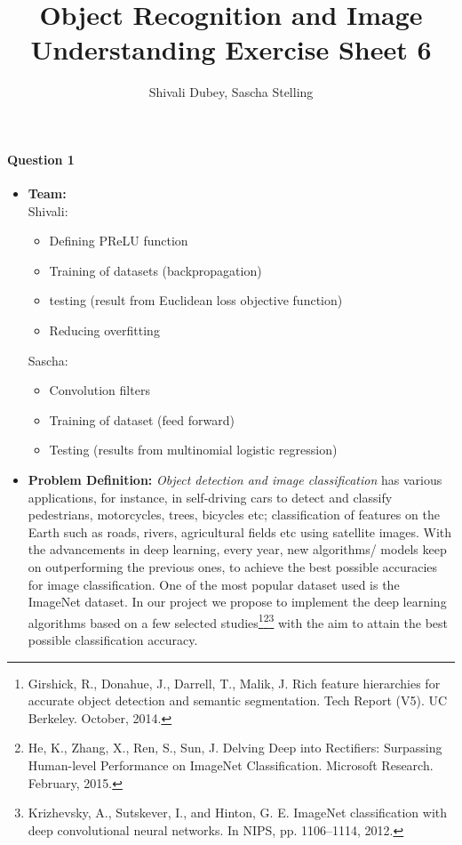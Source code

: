 \documentclass[8pt,a4]{article}
\author{Shivali Dubey, Sascha Stelling}
\title{Object Recognition and Image Understanding Exercise Sheet 6}
\begin{document}
\maketitle

\paragraph{Question 1}
\begin{itemize}
	\item \textbf{Team:} \\Shivali:
	\begin{itemize}
		\item Defining PReLU function
		\item Training of datasets (backpropagation)
		\item testing (result from Euclidean loss objective function)
		\item Reducing overfitting
	\end{itemize}
	Sascha:
	\begin{itemize}
		\item Convolution filters
		\item Training of dataset (feed forward)
		\item Testing (results from multinomial logistic regression)
	\end{itemize}
	\item \textbf{Problem Definition:} \textit{Object detection and image classification} has various applications, for instance, in self-driving cars to detect and classify pedestrians, motorcycles, trees, bicycles etc; classification of features on the Earth such as roads, rivers, agricultural fields etc using satellite images. With the advancements in deep learning, every year, new algorithms/ models keep on outperforming the previous ones, to achieve the best possible accuracies for image classification. One of the most popular dataset used is the ImageNet dataset. In our project we propose to implement the deep learning algorithms based on a few selected studies\footnote{Girshick, R., Donahue, J., Darrell, T., Malik, J. Rich feature hierarchies for accurate object detection and semantic segmentation. Tech Report (V5). UC Berkeley. October, 2014.}\footnote{He, K., Zhang, X., Ren, S., Sun, J. Delving Deep into Rectifiers: Surpassing Human-level Performance on ImageNet Classification. Microsoft Research. February, 2015.}\footnote{Krizhevsky, A., Sutskever, I., and Hinton, G. E. ImageNet classification with deep convolutional neural networks. In NIPS, pp. 1106–1114, 2012.
	} with the aim to attain the best possible classification accuracy.
	

\end{itemize}
\end{document}
